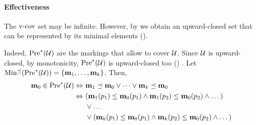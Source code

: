 %
%
%

\paragraph{Effectiveness}
The $\operatorname{v-cov}$ set may be infinite.
However,
by  we obtain an upward-closed set that can be represented by its minimal elements ().

Indeed,
$\operatorname{Pre}^*_{}(\mathcal{U})$ are the markings that allow to cover $\mathcal{U}$.
Since $\mathcal{U}$ is upward-closed, by monotonicity, $\operatorname{Pre}^*_{}(\mathcal{U})$ is upward-closed too () .
Let $\operatorname{Min^\preceq}(\operatorname{Pre}^*_{}(\mathcal{U})) = \{\mathbf{m}_1, \dots, \mathbf{m}_k\}$.
Then,
\begin{align*}
  \mathbf{m}_0 \in \operatorname{Pre}^*_{}(\mathcal{U}) \Leftrightarrow \ &
    \mathbf{m}_1 \preceq \mathbf{m}_0 \vee \dots \vee \mathbf{m}_k \preceq \mathbf{m}_0 \\
  \Leftrightarrow \ &
    (\mathbf{m}_1(p_1) \leq \mathbf{m}_0(p_1) \wedge \mathbf{m}_1(p_2) \leq \mathbf{m}_0(p_2) \wedge \dots) \\
  &\vee \dots \\
  &\vee
    (\mathbf{m}_k(p_1) \leq \mathbf{m}_0(p_1) \wedge \mathbf{m}_k(p_2) \leq \mathbf{m}_0(p_2) \wedge \dots)
\end{align*}

